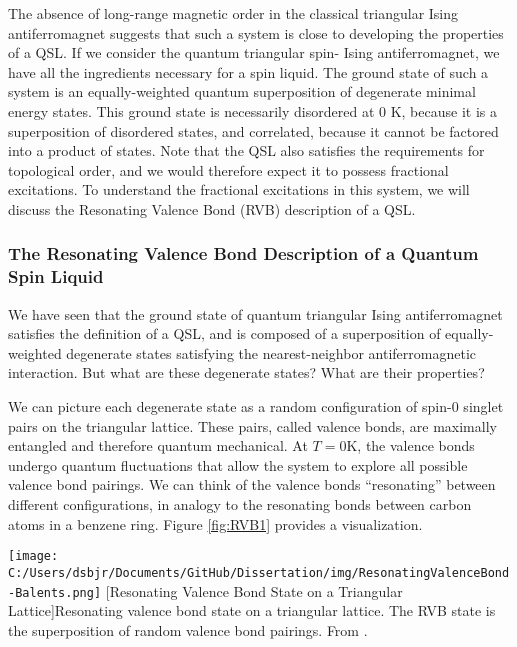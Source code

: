 The absence of long-range magnetic order in the classical triangular Ising antiferromagnet suggests that such a system is close to developing the properties of a QSL. If we consider the quantum triangular spin-\textonehalf{} Ising antiferromagnet, we have all the ingredients necessary for a spin liquid. The ground state of such a system is an equally-weighted quantum superposition of degenerate minimal energy states. This ground state is necessarily disordered at 0 K, because it is a superposition of disordered states, and correlated, because it cannot be factored into a product of states. Note that the QSL also satisfies the requirements for topological order, and we would therefore expect it to possess fractional excitations. To understand the fractional excitations in this system, we will discuss the Resonating Valence Bond (RVB) description of a QSL.


\subsubsection{The Resonating Valence Bond Description of a Quantum Spin Liquid}

We have seen that the ground state of quantum triangular Ising antiferromagnet satisfies the definition of a QSL, and is composed of a superposition of equally-weighted degenerate states satisfying the nearest-neighbor antiferromagnetic interaction. But what are these degenerate states? What are their properties?

We can picture each degenerate state as a random configuration of spin-0 singlet pairs on the triangular lattice. These pairs, called valence bonds, are maximally entangled and therefore quantum mechanical. At $T = 0$K, the valence bonds undergo quantum fluctuations that allow the system to explore all possible valence bond pairings. We can think of the valence bonds ``resonating'' between different configurations, in analogy to the resonating bonds between carbon atoms in a benzene ring. Figure \ref{fig:RVB1} provides a visualization.

\begin{centering}
\texttt{[image: C:/Users/dsbjr/Documents/GitHub/Dissertation/img/ResonatingValenceBond-Balents.png]}
  \captionsetup{width=0.75\textwidth}
  [Resonating Valence Bond State on a Triangular Lattice]{Resonating valence bond state on a triangular lattice. The RVB state is the superposition of random valence bond pairings. From \cite{Balents2010}.}
  \label{fig:RVB1}
\end{centering}

